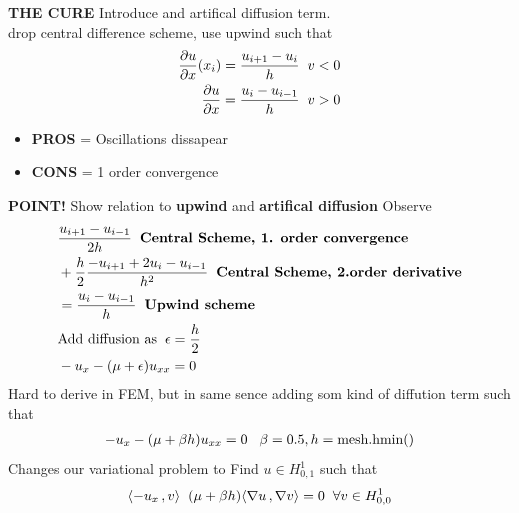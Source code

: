 \documentclass[a4paper,norsk]{article}
\begin{document}
\newpage
\textbf{THE CURE} Introduce and artifical diffusion term. \\ drop central difference scheme, use upwind such that 
\begin{align*}
\pd[u]{x} (x_i) = \frac{u_{i+1}-u_{i}}{h} \hspace{2mm} v < 0 \\
\pd[u]{x} = \frac{u_{i}-u_{i-1}}{h} \hspace{2mm} v > 0
\end{align*}
\begin{itemize}
\item \textbf{PROS} = Oscillations dissapear
\item \textbf{CONS} = 1 order convergence
\end{itemize}
\textbf{POINT!} Show relation to \textbf{upwind} and \textbf{artifical diffusion}
Observe 
\begin{align*}
&\frac{u_{i+1}-u_{i-1}}{2h} \hspace{2mm} \textbf{Central Scheme, 1. order convergence} \\
&+ \frac{h}{2} \frac{-u_{i+1} + 2u_{i} - u_{i-1}}{h^2} \hspace{2mm} \textbf{Central Scheme, 2.order derivative} \\
&= \frac{u_i - u_{i-1}}{h} \hspace{2mm} \textbf{Upwind scheme} \\
&\text{Add diffusion as} \hspace{2mm} \epsilon = \frac{h}{2} \\
&-u_x - (\mu + \epsilon) u_{xx} = 0
\end{align*}
Hard to derive in FEM, but in same sence adding som kind of diffution term such that 
\begin{align*}
-u_x - (\mu + \beta h) u_{xx} = 0 \hspace{3mm} \beta = 0.5,  h = \text{mesh.hmin()}
\end{align*}
Changes our variational problem to
Find $u \in  H^1_{0,1}$ such that 
\begin{align*}
\inner[-u_x]{v} \hspace{2mm} (\mu + \beta h) \inner[\nabla u]{\nabla v} = 0 \hspace{2mm}  \forall v \in H^1_{0,0}
\end{align*} 
\end{document}
